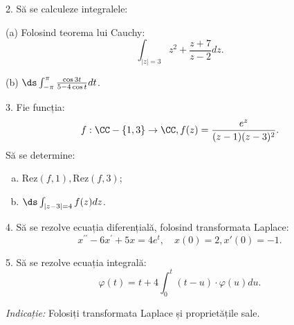 2. Să se calculeze integralele:

(a) Folosind teorema lui Cauchy:
\[
  \int_{|z| = 3} z^2 + \frac{z + 7}{z - 2} dz.
\]

(b) $ \ds\int_{-\pi}^\pi \frac{\cos 3t}{5 - 4\cos t} dt $.

\vspace{0.3cm}

3. Fie funcția:
\[
  f : \CC - \{1, 3\} \to \CC, f(z) = \frac{e^z}{(z - 1)(z - 3)^2}.
\]
Să se determine:
\begin{enumerate}[(a)]
\item $ \mathrm{Rez}(f, 1), \mathrm{Rez}(f, 3) $;
\item $ \ds\int_{|z - 3| = 4} f(z) dz $.
\end{enumerate}

\vspace{0.3cm}

4. Să se rezolve ecuația diferențială, folosind transformata Laplace:
\[
  x^{\prime\prime} - 6x^\prime + 5x = 4e^t, \quad x(0) = 2, x'(0) = -1.
\]

\vspace{0.3cm}

5. Să se rezolve ecuația integrală:
\[
  \varphi(t) = t + 4 \int_0^t (t - u) \cdot \varphi(u) du.
\]

\emph{Indicație:} Folosiți transformata Laplace și proprietățile sale.